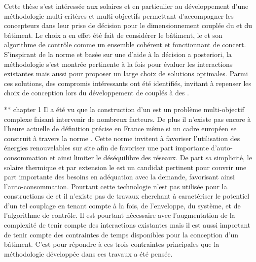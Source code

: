 





Cette thèse s’est intéressée aux  solaires et en particulier au développement
d’une méthodologie multi-critères et multi-objectifs permettant d’accompagner les concepteurs dans leur prise de décision
pour le dimensionnement couplée du  et du bâtiment. Le choix a en
effet été fait de considérer le bâtiment, le  et son algorithme de contrôle comme
un ensemble cohérent et fonctionnant de concert. S’inspirant de la norme
 et basée sur une d’aide à la décision a posteriori, la méthodologie
s’est montrée pertinente à la fois pour évaluer les interactions existantes mais
aussi pour proposer un large choix de solutions optimales. Parmi ces solutions, des
compromis intéressants ont été identifiés, invitant à repenser les choix de conception
lors du développement de  couplés à des .


** chapter 1
Il a été vu que la construction d’un  est un problème multi-objectif complexe
faisant intervenir de nombreux facteurs. De plus il n’existe pas encore à l’heure actuelle
de définition précise en France même si un cadre européen se construit à travers la norme
. Cette norme invitent à favoriser l’utilisation des énergies renouvelables
sur site afin de favoriser une part importante d’auto-consommation et ainsi limiter le
déséquilibre des réseaux. De part sa simplicité, le solaire thermique et par extension
le  est un candidat pertinent pour couvrir une part importante des besoins
en adéquation avec la demande, favorisant ainsi l’auto-consommation. Pourtant cette
technologie n’est pas utilisée pour la constructions de  et il n’existe
pas de travaux cherchant à caractériser le potentiel d’un tel couplage en tenant
compte à la fois, de l’enveloppe, du système, et de l’algorithme de contrôle.
Il est pourtant nécessaire avec l’augmentation de la complexité de tenir compte
des interactions existantes mais il est aussi important de tenir compte des contraintes
de temps disponibles pour la conception d’un bâtiment.
C’est pour répondre à ces trois contraintes principales que la méthodologie développée
dans ces travaux a été pensée.



